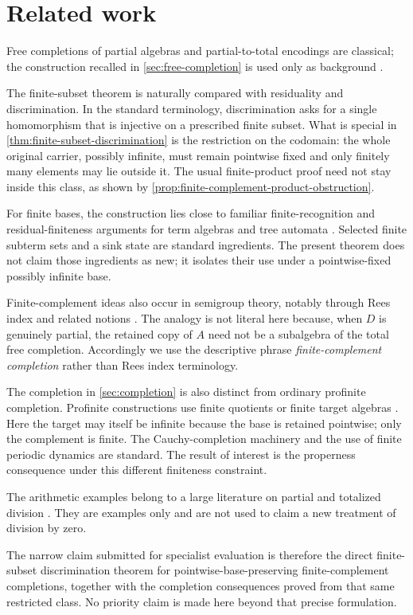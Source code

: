 \section{Related work}\label{sec:related-work}

Free completions of partial algebras and partial-to-total encodings are
classical; the construction recalled in \cref{sec:free-completion} is used only
as background \cite{ClimentVidalCosmeLlopez2023,Diaconescu2009}.

The finite-subset theorem is naturally compared with residuality and
discrimination.  In the standard terminology, discrimination asks for a single
homomorphism that is injective on a prescribed finite subset.  What is special
in \cref{thm:finite-subset-discrimination} is the restriction on the codomain:
the whole original carrier, possibly infinite, must remain pointwise fixed and
only finitely many elements may lie outside it.  The usual finite-product proof
need not stay inside this class, as shown by
\cref{prop:finite-complement-product-obstruction}.

For finite bases, the construction lies close to familiar finite-recognition
and residual-finiteness arguments for term algebras and tree automata
\cite{Brainerd1969,Kozen1977,ComonEtAl2008}.  Selected finite subterm sets and a
sink state are standard ingredients.  The present theorem does not claim those
ingredients as new; it isolates their use under a pointwise-fixed possibly
infinite base.

Finite-complement ideas also occur in semigroup theory, notably through Rees
index and related notions \cite{RuskucThomas1998,CainMaltcev2013}.  The analogy
is not literal here because, when $D$ is genuinely partial, the retained copy
of $A$ need not be a subalgebra of the total free completion.  Accordingly we
use the descriptive phrase \emph{finite-complement completion} rather than Rees
index terminology.

The completion in \cref{sec:completion} is also distinct from ordinary
profinite completion.  Profinite constructions use finite quotients or finite
target algebras \cite{DaveyGouveiaHaviarPriestley2011,ChenAdamekMiliusUrbat2016}.
Here the target may itself be infinite because the base is retained pointwise;
only the complement is finite.  The Cauchy-completion machinery and the use of
finite periodic dynamics are standard.  The result of interest is the
properness consequence under this different finiteness constraint.

The arithmetic examples belong to a large literature on partial and totalized
division \cite{Carlstrom2004,BergstraHirshfeldTucker2009,BergstraTucker2022}.
They are examples only and are not used to claim a new treatment of division by
zero.

The narrow claim submitted for specialist evaluation is therefore the direct
finite-subset discrimination theorem for pointwise-base-preserving
finite-complement completions, together with the completion consequences proved
from that same restricted class.  No priority claim is made here beyond that
precise formulation.
